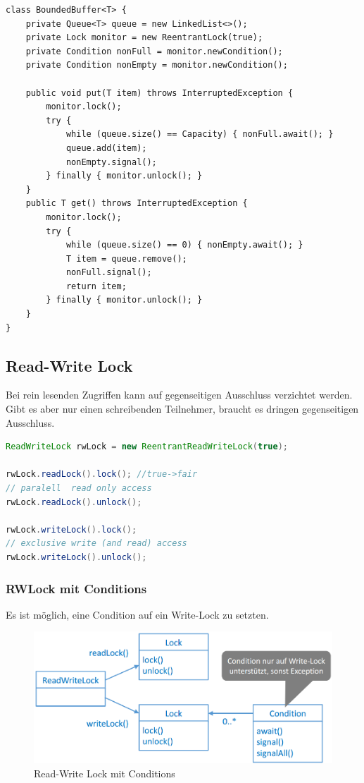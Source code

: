 \begin{lstlisting}
class BoundedBuffer<T> {
	private Queue<T> queue = new LinkedList<>();
	private Lock monitor = new ReentrantLock(true);
	private Condition nonFull = monitor.newCondition();
	private Condition nonEmpty = monitor.newCondition();
	
	public void put(T item) throws InterruptedException {
		monitor.lock(); 
		try {
			while (queue.size() == Capacity) { nonFull.await(); }
			queue.add(item);
			nonEmpty.signal();
		} finally { monitor.unlock(); }
	}
	public T get() throws InterruptedException {
		monitor.lock(); 
		try {
			while (queue.size() == 0) { nonEmpty.await(); }
			T item = queue.remove();
			nonFull.signal();
			return item;
		} finally { monitor.unlock(); } 
	}
}
\end{lstlisting}

\subsection{Read-Write Lock}
Bei rein lesenden Zugriffen kann auf gegenseitigen Ausschluss verzichtet werden. Gibt es aber nur einen schreibenden Teilnehmer, braucht es dringen gegenseitigen Ausschluss.

\begin{lstlisting}[language=java]
ReadWriteLock rwLock = new ReentrantReadWriteLock(true); 

rwLock.readLock().lock(); //true->fair
// paralell  read only access
rwLock.readLock().unlock();

rwLock.writeLock().lock();
// exclusive write (and read) access
rwLock.writeLock().unlock();
\end{lstlisting}


\subsubsection{RWLock mit Conditions}

Es ist möglich, eine Condition auf ein Write-Lock zu setzten.

\begin{figure}[h!]
	\centering
	\includegraphics[width=0.7\linewidth]{img/rw_lock_conditions}
	\caption{Read-Write Lock mit Conditions}
	\label{fig:rwlockconditions}
\end{figure}

